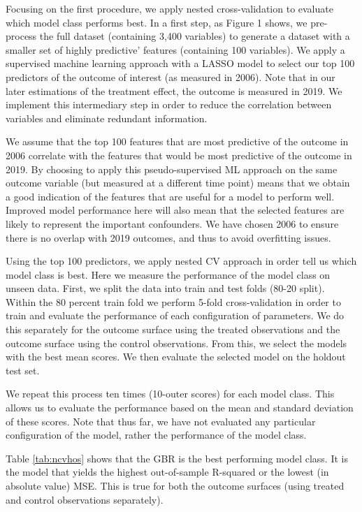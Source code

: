 \documentclass[12pt, a4paper]{article}
\begin{document}
Focusing on the first procedure, we apply nested cross-validation to evaluate which model class performs best. In a first step, as Figure 1 shows, we pre-process the full dataset (containing 3,400 variables) to generate a dataset with a smaller set of highly predictive’ features (containing 100 variables). We apply a supervised machine learning approach with a LASSO model to select our top 100 predictors of the outcome of interest (as measured in 2006). Note that in our later estimations of the treatment effect, the outcome is measured in 2019. We implement this intermediary step in order to reduce the correlation between variables and eliminate redundant information. 

We assume that the top 100 features that are most predictive of the outcome in 2006 correlate with the features that would be most predictive of the outcome in 2019. By choosing to apply this pseudo-supervised ML approach on the same outcome variable (but measured at a different time point) means that we obtain a good indication of the features that are useful for a model to perform well. Improved model performance here will also mean that the selected features are likely to represent the important confounders. We have chosen 2006 to ensure there is no overlap with 2019 outcomes, and thus to avoid overfitting issues. 

Using the top 100 predictors, we apply nested CV approach in order tell us which model class is best. Here we measure the performance of the model class on unseen data. First, we split the data into train and test folds (80-20 split). Within the 80 percent train fold we perform 5-fold cross-validation in order to train and evaluate the performance of each configuration of parameters. We do this separately for the outcome surface using the treated observations and the outcome surface using the control observations. From this, we select the models with the best mean scores. We then evaluate the selected model on the holdout test set. 

We repeat this process ten times (10-outer scores) for each model class. This allows us to evaluate the performance based on the mean and standard deviation of these scores. Note that thus far, we have not evaluated any particular configuration of the model, rather the performance of the model class.

Table \ref{tab:ncvhos} shows that the GBR is the best performing model class. It is the model that yields the highest out-of-sample R-squared or the lowest (in absolute value) MSE. This is true for both the outcome surfaces (using treated and control observations separately). 
\end{document}
